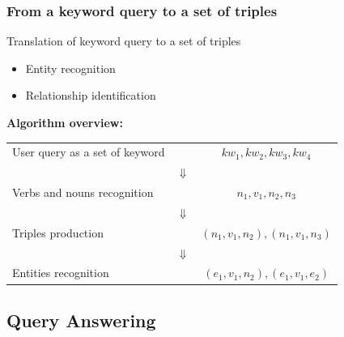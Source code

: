 \documentclass{beamer}
\begin{document}
\begin{frame}
\frametitle{From a keyword query to a set of triples}
Translation of keyword query to a set of triples
\begin{itemize}
\item Entity recognition
\item Relationship identification
\end{itemize}
\vspace{5mm}
{\color{red}\bfseries{Algorithm overview:}}\\
\vspace{3mm}
\begin{tabular}{lcc}
User query as a set of keyword && $kw_{1}, kw_{2}, kw_{3}, kw_{4}$\\
& $\Downarrow$ &\\
Verbs and nouns recognition && $n_{1}, v_{1}, n_{2}, n_{3}$\\
& $\Downarrow$ &\\
Triples production && $(n_{1}, v_{1}, n_{2}), (n_{1}, v_{1}, n_{3})$\\
& $\Downarrow$ &\\
Entities recognition && $(e_{1}, v_{1}, n_{2}), (e_{1}, v_{1}, e_{2})$\\
\end{tabular}
\end{frame}

\subsection{Query Answering}
\end{document}
